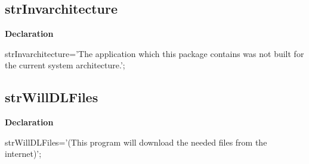 \documentclass{report}
\newif\ifpdf
\begin{document}
\subsection*{strInvarchitecture}
\fi
\label{trstrings-strInvarchitecture}
\begin{list}{}{
\setlength{\itemindent}{0cm}
\setlength{\listparindent}{0cm}
\setlength{\leftmargin}{\evensidemargin}
\addtolength{\leftmargin}{\tmplength}
\settowidth{\labelsep}{X}
\addtolength{\leftmargin}{\labelsep}
\setlength{\labelwidth}{\tmplength}
}
\item[\textbf{Declaration}\hfill]
\ifpdf
\begin{flushleft}
\fi
\begin{ttfamily}
strInvarchitecture='The application which this package contains was not built for the current system architecture.';\end{ttfamily}

\ifpdf
\end{flushleft}
\fi

\end{list}
\ifpdf
\subsection*{\large{\textbf{strWillDLFiles}}\normalsize\hspace{1ex}\hrulefill}
\else
\subsection*{strWillDLFiles}
\fi
\label{trstrings-strWillDLFiles}
\begin{list}{}{
\setlength{\itemindent}{0cm}
\setlength{\listparindent}{0cm}
\setlength{\leftmargin}{\evensidemargin}
\addtolength{\leftmargin}{\tmplength}
\settowidth{\labelsep}{X}
\addtolength{\leftmargin}{\labelsep}
\setlength{\labelwidth}{\tmplength}
}
\item[\textbf{Declaration}\hfill]
\ifpdf
\begin{flushleft}
\fi
\begin{ttfamily}
strWillDLFiles='(This program will download the needed files from the internet)';\end{ttfamily}

\ifpdf
\end{flushleft}
\fi

\end{list}
\ifpdf
\end{document}
